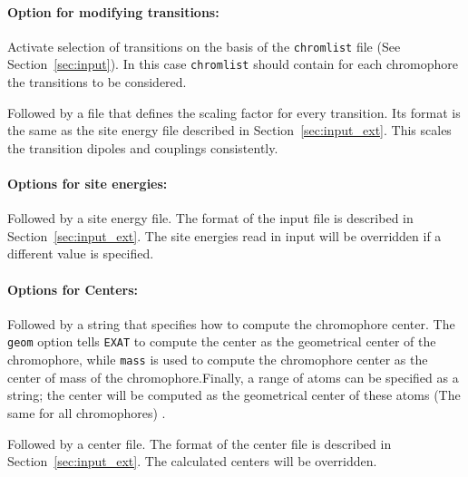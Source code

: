 \documentclass[a4paper,11pt]{article}
\begin{document}
\paragraph*{Option for modifying transitions:}
\begin{description}[labelsep=10pt, align=left, labelwidth=80pt,labelindent=0pt,leftmargin=90pt]
\item[\texttt{-{}-seltran}] Activate selection of transitions on the basis of the \texttt{chromlist} file (See Section~\ref{sec:input}). In this case \texttt{chromlist} should contain for each chromophore the transitions to be considered. 
\item[\texttt{-{}-scaletran}] Followed by a file that defines the scaling factor for every transition. Its format is the same as the site energy file  described in Section~\ref{sec:input_ext}. This scales the transition dipoles and couplings consistently.
\end{description}

\paragraph*{Options for site energies:}
\begin{description}[labelsep=10pt, align=left, labelwidth=90pt,labelindent=0pt,leftmargin=100pt]
\item[\texttt{-{}-insite,-{}-site}] Followed by a site energy file. The format of the input file is described in Section~\ref{sec:input_ext}. The site energies read in input will be overridden if a different value is specified.
\end{description}

\paragraph*{Options for Centers:}
\begin{description}[labelsep=10pt, align=left, labelwidth=80pt,labelindent=0pt,leftmargin=90pt]
\item[\texttt{-{}-cent}] Followed by a string that specifies how to compute the chromophore center. The \texttt{geom} option tells \texttt{EXAT} to compute the center as the geometrical center of the chromophore, while \texttt{mass} is used to compute the chromophore center as the center of mass of the chromophore.Finally, a range of atoms can be specified as a string; the center will be computed as the geometrical center of these atoms (The same for all chromophores) . 
\item[\texttt{-{}-incent}] Followed by a center file. The format of the center file is described in Section~\ref{sec:input_ext}. The calculated centers will be overridden.
\end{description}
\end{document}
